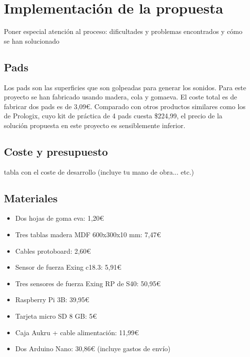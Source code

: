 \documentclass{article}
\begin{document}
\section{Implementación de la propuesta}
\label{sec:Implementacion}

    Poner especial atención al proceso: dificultades y problemas encontrados y cómo se han solucionado

        \subsection{Pads} %
        \label{sub:Pads}

            Los pads son las superficies que son golpeadas para generar los sonidos. Para este proyecto se han fabricado
            usando madera, cola y gomaeva\cite{GomaEva}. El coste total es de fabricar dos pads es de 3,09\euro{}.
            Comparado con otros productos similares como los de Prologix\cite{practice_pad}, cuyo kit de práctica de 4
            pads cuesta \$224,99, el precio de la solución propuesta en este proyecto es sensiblemente inferior.


        \subsection{Coste y presupuesto} %
        \label{sub:CosteYPresupuesto}

            tabla con el coste de desarrollo (incluye tu mano de obra... etc.)


        \subsection{Materiales} %
        \label{sub:Materiales}

            \begin{itemize}
                \item Dos hojas de goma eva: 1,20\euro{}
                \item Tres tablas madera MDF 600x300x10 mm: 7,47\euro{}
                \item Cables protoboard: 2,60\euro{}
                \item Sensor de fuerza Exing c18.3: 5,91\euro{}
                \item Tres sensores de fuerza Exing RP de S40: 50,95\euro{}
                \item Raspberry Pi 3B: 39,95\euro{}
                \item Tarjeta micro SD 8 GB: 5\euro{}
                \item Caja Aukru + cable alimentación: 11,99\euro{}
                \item Dos Arduino Nano: 30,86\euro{} (incluye gastos de envío)
            \end{itemize}
\end{document}

